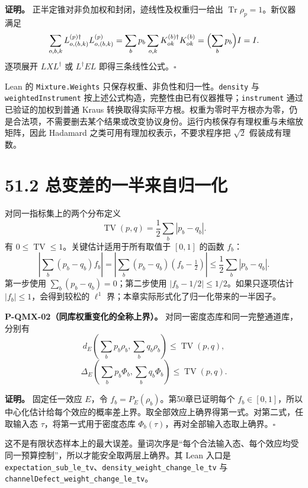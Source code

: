 \documentclass[
  11pt,
  oneside]{book}
\begin{document}
\textbf{证明。} 正半定锥对非负加权和封闭，迹线性及权重归一给出
\(\operatorname{Tr}\rho_p=1\)。新仪器满足 \[
\sum_{o,b,k}L^{(p)\dagger}_{o,(b,k)}L^{(p)}_{o,(b,k)}
=\sum_b p_b\sum_{o,k}K^{(b)\dagger}_{ok}K^{(b)}_{ok}
=\Bigl(\sum_b p_b\Bigr)I=I.
\] 逐项展开 \(LXL^\dagger\) 或 \(L^\dagger EL\)
即得三条线性公式。\(\square\)

Lean 的 \texttt{Mixture.\allowbreak Weights}
只保存权重、非负性和归一性。\texttt{density} 与
\texttt{weighted\allowbreak Instrument}
按上述公式构造，完整性由已有仪器推导；\texttt{instrument}
通过已验证的加权到普通 Kraus
转换取得实际平方根。权重为零时平方根亦为零，仍是合法项，不需要删去某个结果或改变协议身份。运行内核保存有理权重与未缩放矩阵，因此
Hadamard 之类可用有理加权表示，不要求程序把 \(\sqrt2\) 假装成有理数。

\section{51.2 总变差的一半来自归一化}

对同一指标集上的两个分布定义 \[
\operatorname{TV}(p,q)=\frac12\sum_b|p_b-q_b|.
\] 有 \(0\le\operatorname{TV}\le1\)。关键估计适用于所有取值于 \([0,1]\)
的函数 \(f_b\)： \[
\left|\sum_b(p_b-q_b)f_b\right|
=\left|\sum_b(p_b-q_b)(f_b-\tfrac12)\right|
\le\frac12\sum_b|p_b-q_b|.
\] 第一步使用 \(\sum_b(p_b-q_b)=0\)；第二步使用
\(|f_b-1/2|\le1/2\)。如果只逐项估计 \(|f_b|\le1\)，会得到较松的
\(\ell^1\) 界；本章实际形式化了归一化带来的一半因子。

\protect\hypertarget{p-qmx-02}{}{}

\textbf{P-QMX-02（同库权重变化的全称上界）。}
对同一密度态库和同一完整通道库，分别有 \[
d_E\left(\sum_b p_b\rho_b,\sum_b q_b\rho_b\right)
\le\operatorname{TV}(p,q),
\] \[
\Delta_E\left(\sum_b p_b\Phi_b,\sum_b q_b\Phi_b\right)
\le\operatorname{TV}(p,q).
\]

\textbf{证明。} 固定任一效应 \(E\)，令
\(f_b=P_E(\rho_b)\)。第50章已证明每个
\(f_b\in[0,1]\)，所以中心化估计给每个效应的概率差上界。取全部效应上确界得第一式。对第二式，任取输入态
\(\tau\)，将第一式用于密度态库
\(\Phi_b(\tau)\)，再对全部输入态取上确界。\(\square\)

这不是有限状态样本上的最大误差。量词次序是``每个合法输入态、每个效应均受同一预算控制''，所以才能安全取两层上确界。其
Lean 入口是
\texttt{expectation\_\allowbreak sub\_\allowbreak le\_\allowbreak tv}、\allowbreak \texttt{density\_\allowbreak weight\_\allowbreak change\_\allowbreak le\_\allowbreak tv}
与 \texttt{channel\allowbreak Defect\_\allowbreak weight\_\allowbreak change\_\allowbreak le\_\allowbreak tv}。
\end{document}
